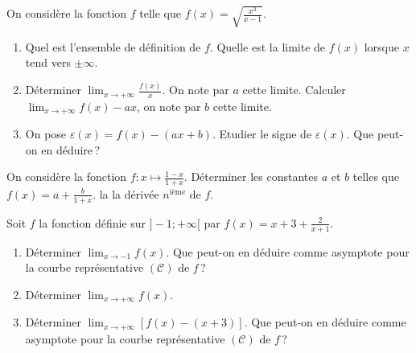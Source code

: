 %
      \begin{exo}
            On consid\`ere la fonction $f$ telle que $f(x) = \sqrt{\frac{x^3}{x-1}}$.
            \begin{enumerate}
                  \item Quel est l'ensemble de d\'efinition de $f$.
                        Quelle est la limite de $f(x)$ lorsque $x$ tend vers $\pm \infty$.
                  \item D\'eterminer $\lim_{x\rightarrow+\infty} \frac{f(x)}{x}$. On note par $a$ cette limite.
                        Calculer $\lim_{x\rightarrow+\infty} f(x) - ax$, on note par $b$ cette limite.
                  \item On pose $\varepsilon (x) = f(x) - (ax + b)$.
                        Etudier le signe de $\varepsilon (x)$.
                        Que peut-on en d\'eduire\,?
            \end{enumerate}
      \end{exo}
%
      \begin{exo}
            On consid\`ere la fonction $f:x\mapsto\frac{1-x}{1+x}$.
            D\'eterminer les constantes $a$ et $b$ telles que $f(x) = a + \frac{b}{1+x}$.
             la  la d\'eriv\'ee $n^\text{i\`eme}$ de $f$.
      \end{exo}
%
      \begin{exo}
            Soit $f$ la fonction d\'efinie sur $]-1 ; +\infty[$ par $f(x) = x + 3 + \frac{2}{x+1}$.
            \begin{enumerate}
                  \item D\'eterminer $\lim_{x\rightarrow-1} f(x)$.
                        Que peut-on en d\'eduire comme asymptote pour la courbe repr\'esentative $(\mathscr{C})$ de $f$\,?
                  \item D\'eterminer $\lim_{x\rightarrow+\infty} f(x)$.
                  \item D\'eterminer $\lim_{x\rightarrow+\infty} \left[ f(x) - (x+3) \right]$.
                        Que peut-on en d\'eduire comme asymptote pour la courbe repr\'esentative $(\mathscr{C})$ de $f$\,?
            \end{enumerate}
      \end{exo}
%
